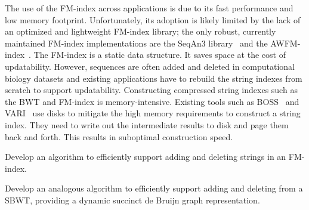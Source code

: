 
The use of the FM-index across applications is due to its fast performance and low memory footprint. Unfortunately, its adoption is likely limited by the lack of an optimized and lightweight FM-index library; the only robust, currently maintained FM-index implementations are the SeqAn3 library~\cite{Reinert2017} and the AWFM-index~\cite{Anderson2021}. 
%
The FM-index is a static data structure. It saves space at the cost of updatability. However, sequences are often added and deleted in computational biology datasets and existing applications have to rebuild the string indexes from scratch to support updatability.
%
Constructing compressed string indexes such as the BWT and FM-index is memory-intensive. Existing tools such as BOSS~\cite{bowe2012succinct} and VARI~\cite{Muggli2019} use disks to mitigate the high memory requirements to construct a string index. They need to write out the intermediate results to disk and page them back and forth. This results in suboptimal construction speed.
%


\begin{rproblem}
Develop an algorithm to efficiently support adding and deleting strings in an FM-index.
\label{rpob:dynamic-fmindex}
\end{rproblem}

\begin{rproblem}
Develop an analogous algorithm to efficiently support adding and deleting \kmers from a SBWT, providing a dynamic succinct de Bruijn graph representation.
\label{rpob:dynamic-sbwt}
\end{rproblem}

